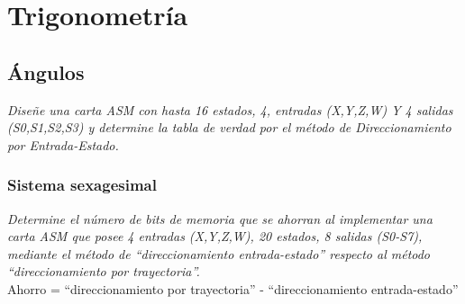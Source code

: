\documentclass[12pt]{book}
\begin{document}

\graphicspath{ {latex/assets/} }
\newcommand{\materia}{Trigonometría}


\chapter{\materia}

\lipsum[1]

\section{Ángulos}

\textit{Diseñe una carta ASM con hasta 16 estados, 4, entradas (X,Y,Z,W) Y
4 salidas (S0,S1,S2,S3) y determine la tabla de verdad por el método
de Direccionamiento por Entrada-Estado.}\\


\subsection{Sistema sexagesimal}

\begin{activity}{0.78}
  \lipsum[1]
\end{activity}

\textit{Determine el número de bits de memoria que se ahorran al
implementar una carta ASM que posee 4 entradas (X,Y,Z,W), 20
estados, 8 salidas (S0-S7), mediante el método de ``direccionamiento
entrada-estado'' respecto al método ``direccionamiento por trayectoria''.}\\

Ahorro = ``direccionamiento por trayectoria'' - ``direccionamiento
entrada-estado''\\ 

\end{document}
